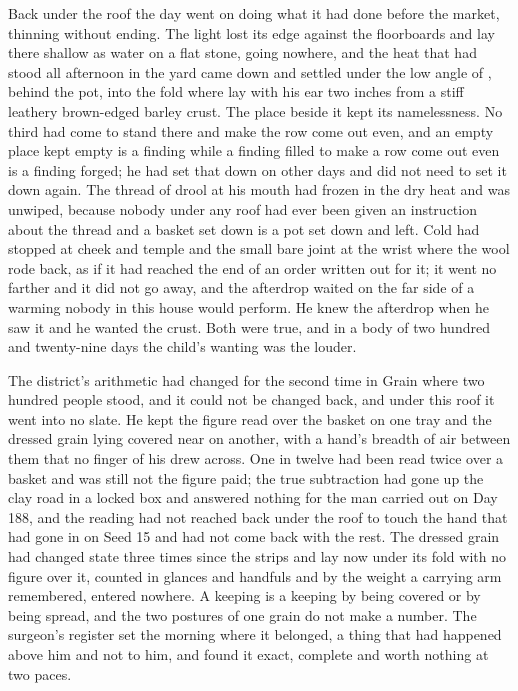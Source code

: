 Back under the roof the day went on doing what it had done before the market, thinning without ending. The light lost its edge against the floorboards and lay there shallow as water on a flat stone, going nowhere, and the heat that had stood all afternoon in the yard came down and settled under the low angle of , behind the pot, into the fold where  lay with his ear two inches from a stiff leathery brown-edged barley crust. The place beside it kept its namelessness. No third had come to stand there and make the row come out even, and an empty place kept empty is a finding while a finding filled to make a row come out even is a finding forged; he had set that down on other days and did not need to set it down again. The thread of drool at his mouth had frozen in the dry heat and was unwiped, because nobody under any roof had ever been given an instruction about the thread and a basket set down is a pot set down and left. Cold had stopped at cheek and temple and the small bare joint at the wrist where the wool rode back, as if it had reached the end of an order written out for it; it went no farther and it did not go away, and the afterdrop waited on the far side of a warming nobody in this house would perform. He knew the afterdrop when he saw it and he wanted the crust. Both were true, and in a body of two hundred and twenty-nine days the child's wanting was the louder.

The district's arithmetic had changed for the second time in Grain where two hundred people stood, and it could not be changed back, and under this roof it went into no slate. He kept the figure read over the basket on one tray and the dressed grain lying covered near  on another, with a hand's breadth of air between them that no finger of his drew across. One in twelve had been read twice over a basket and was still not the figure paid; the true subtraction had gone up the clay road in a locked box and answered nothing for the man carried out on Day 188, and the reading had not reached back under the roof to touch the hand that had gone in on Seed 15 and had not come back with the rest. The dressed grain had changed state three times since the strips and lay now under its fold with no figure over it, counted in glances and handfuls and by the weight a carrying arm remembered, entered nowhere. A keeping is a keeping by being covered or by being spread, and the two postures of one grain do not make a number. The surgeon's register set the morning where it belonged, a thing that had happened above him and not to him, and found it exact, complete and worth nothing at two paces.

